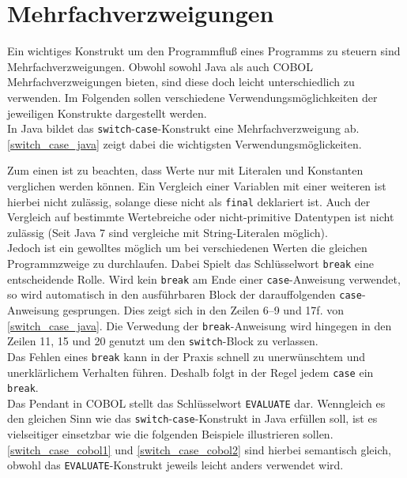 \section{Mehrfachverzweigungen}\label{mehrfachverzweigungen}
Ein wichtiges Konstrukt um den Programmfluß eines Programms zu steuern sind Mehrfachverzweigungen. Obwohl sowohl Java als auch COBOL Mehrfachverzweigungen bieten, sind diese doch leicht unterschiedlich zu verwenden. Im Folgenden sollen verschiedene Verwendungsmöglichkeiten der jeweiligen Konstrukte dargestellt werden.\\

In Java bildet das \texttt{switch}-\texttt{case}-Konstrukt eine Mehrfachverzweigung ab. \autoref{switch_case_java} zeigt dabei die wichtigsten Verwendungsmöglickeiten.


Zum einen ist zu beachten, dass Werte nur mit Literalen und Konstanten verglichen werden können. Ein Vergleich einer Variablen mit einer weiteren ist hierbei nicht zulässig, solange diese nicht als \texttt{final} deklariert ist. Auch der Vergleich auf bestimmte Wertebreiche oder nicht-primitive Datentypen ist nicht zulässig (Seit Java 7 sind vergleiche mit String-Literalen möglich).\\

Jedoch ist ein gewolltes  möglich um bei verschiedenen Werten die gleichen Programmzweige zu durchlaufen. Dabei Spielt das Schlüsselwort \texttt{break} eine entscheidende Rolle. Wird kein \texttt{break} am Ende einer \texttt{case}-Anweisung verwendet, so wird automatisch in den ausführbaren Block der darauffolgenden \texttt{case}-Anweisung gesprungen. Dies zeigt sich in den Zeilen 6--9 und 17f. von \autoref{switch_case_java}. Die Verwedung der \texttt{break}-Anweisung wird hingegen in den Zeilen 11, 15 und 20 genutzt um den \texttt{switch}-Block zu verlassen.\\ 

Das Fehlen eines \texttt{break} kann in der Praxis schnell zu unerwünschtem und unerklärlichem Verhalten führen. Deshalb folgt in der Regel jedem \texttt{case} ein \texttt{break}. \\

Das Pendant in COBOL stellt das Schlüsselwort \texttt{EVALUATE} dar. Wenngleich es den gleichen Sinn wie das \texttt{switch}-\texttt{case}-Konstrukt in Java erfüllen soll, ist es vielseitiger einsetzbar wie die folgenden Beispiele illustrieren sollen. \autoref{switch_case_cobol1} und \autoref{switch_case_cobol2} sind hierbei semantisch gleich, obwohl das \texttt{EVALUATE}-Konstrukt jeweils leicht anders verwendet wird.\\

